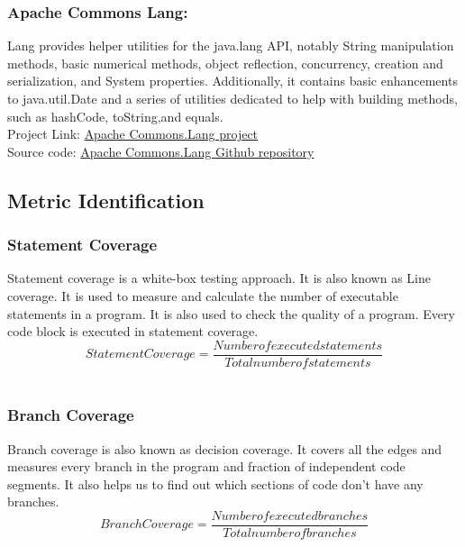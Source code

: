 \documentclass[letterpaper, 12 pt, conference]{ieeetran}  %
\begin{document}
\subsubsection{Apache Commons Lang:}
Lang provides helper utilities for the java.lang API, notably String manipulation methods, basic numerical methods, object reflection, concurrency, creation and serialization, and System properties. Additionally, it contains basic enhancements to java.util.Date and a series of utilities dedicated to help with building methods, such as hashCode, toString,and equals.\cite{projectlang}\\
Project Link: \href{http://commons.apache.org/proper/commons-lang/}{Apache Commons.Lang project}\cite{projectlang}  \\
Source code: \href{http://github.com/apache/commons-lang/}{Apache Commons.Lang Github repository}\cite{projectlanggit}

\begin{table}[H]
    \centering
\end{table}

\subsection{Metric Identification}
\subsubsection{Statement Coverage} Statement coverage is a white-box testing approach. It is also known as Line coverage. It is used to measure and calculate the number of executable statements in a program. It
is also used to check the quality of a program. Every code block is executed in statement
coverage.
\small\[Statement Coverage = \dfrac {Number of executed statements} {Total number of statements}\]
\\
\subsubsection{Branch Coverage} Branch coverage is also known as decision coverage. It covers all the edges and measures every branch in the program and fraction of independent code segments. It
also helps us to find out which sections of code don't have any branches.
\small\[Branch Coverage =\dfrac{Number of executed branches}{Total number of branches}\]
\end{document}
